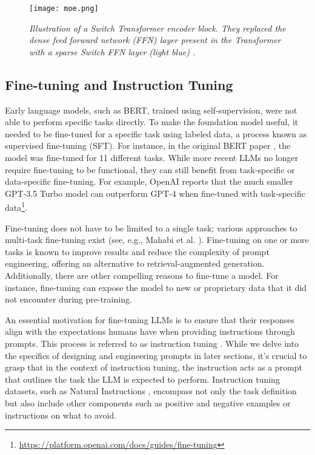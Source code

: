 \begin{figure}[H]
    \centering
    \texttt{[image: moe.png]}
    \caption[Illustration of a Switch Transformer encoder block \cite{fedus2022switch}.]{
        \it{Illustration of a Switch Transformer encoder block.
            They replaced the dense feed forward network (FFN) layer present in the Transformer with a sparse Switch FFN layer
            (light blue) \cite{fedus2022switch}.}
    }
    \label{fig:moe}
\end{figure}


\subsection{Fine-tuning and Instruction Tuning}

Early language models, such as BERT, trained using self-supervision, were not able to perform specific tasks directly. To make the foundation model useful, it needed to be fine-tuned for a specific task using labeled data, a process known as supervised fine-tuning (SFT). For instance, in the original BERT paper \cite{devlin2019bert}, the model was fine-tuned for 11 different tasks. While more recent LLMs no longer require fine-tuning to be functional, they can still benefit from task-specific or data-specific fine-tuning. For example, OpenAI reports that the much smaller GPT-3.5 Turbo model can outperform GPT-4 when fine-tuned with task-specific data\footnote{\url{https://platform.openai.com/docs/guides/fine-tuning}}.

Fine-tuning does not have to be limited to a single task; various approaches to multi-task fine-tuning exist (see, e.g., Mahabi et al. \cite{mahabadi2021parameterefficient}). Fine-tuning on one or more tasks is known to improve results and reduce the complexity of prompt engineering, offering an alternative to retrieval-augmented generation. Additionally, there are other compelling reasons to fine-tune a model. For instance, fine-tuning can expose the model to new or proprietary data that it did not encounter during pre-training.

An essential motivation for fine-tuning LLMs is to ensure that their responses align with the expectations humans have when providing instructions through prompts. This process is referred to as instruction tuning \cite{zhang2024instruction}. While we delve into the specifics of designing and engineering prompts in later sections, it's crucial to grasp that in the context of instruction tuning, the instruction acts as a prompt that outlines the task the LLM is expected to perform. Instruction tuning datasets, such as Natural Instructions \cite{mishra2022crosstask}, encompass not only the task definition but also include other components such as positive and negative examples or instructions on what to avoid.

